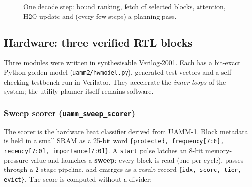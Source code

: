 \documentclass[12pt,a4paper]{report}
\begin{document}
\begin{figure}[htbp]
{
}
\caption{One decode step: bound ranking, fetch of selected blocks, attention, H2O update and (every few steps) a planning pass.}
\end{figure}
\subsection{Hardware: three verified RTL blocks}\label{sec:5_8}
Three modules were written in synthesisable Verilog-2001. Each has a bit-exact Python golden model (\texttt{uamm2/\allowbreak{}hwmodel.\allowbreak{}py}), generated test vectors and a self-checking testbench run in Verilator. They accelerate the \textit{inner loops} of the system; the utility planner itself remains software.

\subsubsection{Sweep scorer (\texttt{uamm\_\allowbreak{}\allowbreak{}sweep\_\allowbreak{}\allowbreak{}scorer})}\label{sec:5_8_1}
The scorer is the hardware heat classifier derived from UAMM-1. Block metadata is held in a small SRAM as a 25-bit word \texttt{\{protected, frequency[7:0], recency[7:0], importance[7:0]\}}. A \texttt{start} pulse latches an 8-bit memory-pressure value and launches a \textbf{sweep}: every block is read (one per cycle), passes through a 2-stage pipeline, and emerges as a result record \texttt{\{idx, score, tier, evict\}}. The score is computed without a divider:
\end{document}
